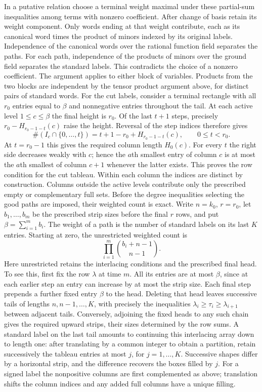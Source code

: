 \documentclass[11pt]{amsart}
\theoremstyle{definition}
\theoremstyle{remark}
\begin{document}
In a putative relation choose a terminal weight maximal under
these partial-sum inequalities among terms with nonzero coefficient.
After change of basis retain its weight component. Only words
ending at that weight contribute, each as its canonical word
times the product of minors indexed by its original labels.
Independence of the canonical words over the rational function
field separates the paths. For each path, independence of the
products of minors over the ground field separates the standard
labels. This contradicts the choice of a nonzero coefficient.
The argument applies to either block of variables. Products from
the two blocks are independent by the tensor product argument
above, for distinct pairs of standard words. For the cut labels,
consider a terminal rectangle with all $r_0$ entries equal to
$\beta$ and nonnegative entries throughout the tail. At each
active level $1\le c\le\beta$ the final height is $r_0$. Of the
last $t+1$ steps, precisely $r_0-H_{r_0-1-t}(c)$ raise the
height. Reversal of the step indices therefore gives
\[
 \#(I_c\cap\{0,\ldots,t\})
 =t+1-r_0+H_{r_0-1-t}(c),\qquad 0\le t<r_0 .
\]
At $t=r_0-1$ this gives the required column length $H_0(c)$.
For every $t$ the right side decreases weakly with $c$; hence the
$a$th smallest entry of column $c$ is at most the $a$th smallest
of column $c+1$ whenever the latter exists. This proves the row
condition for the cut tableau. Within each column the indices
are distinct by construction. Columns outside the active levels
contribute only the prescribed empty or complementary full sets.
Before the degree inequalities selecting the good paths are
imposed, their weighted count is exact. Write $n=k_0$,
$r=r_0$, let $b_1,\ldots,b_m$ be the prescribed strip sizes
before the final $r$ rows, and put $\beta=\sum_{i=1}^m b_i$.
The weight of a path is the number of standard labels on its
last $K$ entries. Starting at zero, the unrestricted weighted count is
\[
                    \prod_{i=1}^m\binom{b_i+n-1}{n-1}.
\]
Here unrestricted retains the interlacing conditions and the
prescribed final head. To see this, first fix the row $\lambda$
at time $m$. All its entries are at most $\beta$, since at each
earlier step an entry can increase by at most the strip size.
Each final step prepends a further fixed entry $\beta$ to the
head. Deleting that head leaves successive tails of lengths
$n,n-1,\ldots,K$, with precisely the inequalities
$\lambda_i\ge\tau_i\ge\lambda_{i+1}$ between adjacent tails.
Conversely, adjoining the fixed heads to any such chain gives
the required upward strips, their sizes determined by the row sums.
A standard label on the last tail amounts to continuing this
interlacing array down to length one: after translating by a
common integer to obtain a partition, retain successively the
tableau entries at most $j$, for $j=1,\ldots,K$. Successive shapes
differ by a horizontal strip, and the difference recovers the
boxes filled by $j$. For a signed label the nonpositive columns
are first complemented as above; translation shifts the column
indices and any added full columns have a unique filling.
\end{document}
